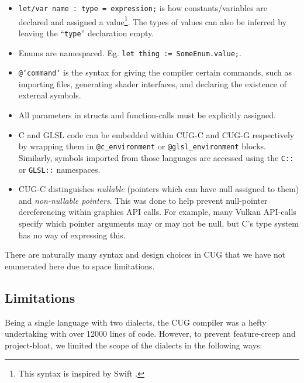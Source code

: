\documentclass[a4paper,12pt,twoside,openright]{report}
\def\compilerloccount{12000 }
\begin{document}
\begin{itemize}

    \item \texttt{let/var name : type = expression;} is how constants/variables
    are declared and assigned a value\footnote{This syntax is inspired by Swift
    \cite{SwiftSyntax}.}. The types of values can also be inferred by leaving
    the ``\texttt{type}'' declaration empty.

    \item Enums are namespaced. Eg. \texttt{let thing := SomeEnum.value;}.

    \item \texttt{@`command`} is the syntax for giving the compiler certain
    commands, such as importing files, generating shader interfaces, and
    declaring the existence of external symbols.

    \item All parameters in structs and function-calls must be explicitly
    assigned.

    \item C and GLSL code can be embedded within CUG-C and CUG-G respectively
    by wrapping them in \texttt{@c\_environment} or \texttt{@glsl\_environment}
    blocks. Similarly, symbols imported from those languages are accessed using
    the \texttt{C::} or \texttt{GLSL::} namespaces.

    \item CUG-C distinguishes \textit{nullable} (pointers which can have null
    assigned to them) and \textit{non-nullable pointers}. This was done to help
    prevent null-pointer dereferencing within graphics API calls. For example,
    many Vulkan API-calls specify which pointer arguments may or may not be
    null, but C's type system has no way of expressing this.

\end{itemize}

There are naturally many syntax and design choices in CUG that we have not
enumerated here due to space limitations.

\subsection{Limitations}

\label{subsec:limitations}

Being a single language with two dialects, the CUG compiler was a hefty
undertaking with over \compilerloccount lines of code. However, to prevent
feature-creep and project-bloat, we limited the scope of the dialects in the
following ways:
\end{document}
